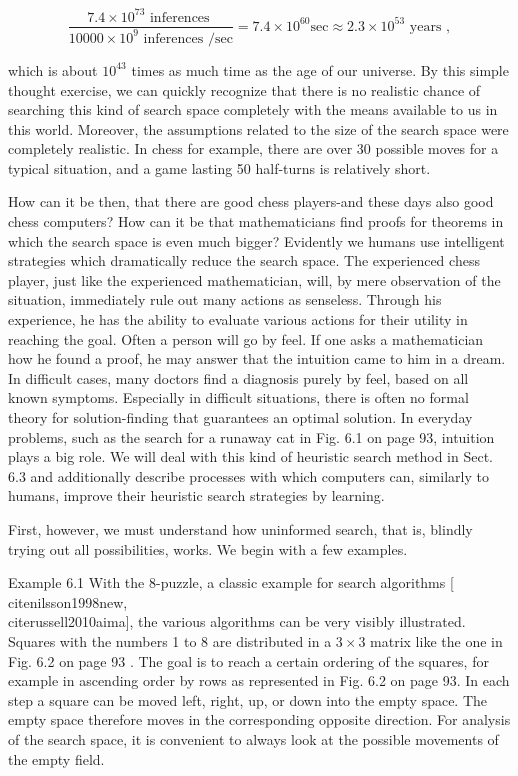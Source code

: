 \documentclass[10pt]{book}
\begin{document}
$$
\frac{7.4 \times 10^{73} \text { inferences }}{10000 \times 10^{9} \text { inferences } / \mathrm{sec}}=7.4 \times 10^{60} \mathrm{sec} \approx 2.3 \times 10^{53} \text { years },
$$

which is about $10^{43}$ times as much time as the age of our universe. By this simple thought exercise, we can quickly recognize that there is no realistic chance of searching this kind of search space completely with the means available to us in this world. Moreover, the assumptions related to the size of the search space were completely realistic. In chess for example, there are over 30 possible moves for a typical situation, and a game lasting 50 half-turns is relatively short.

How can it be then, that there are good chess players-and these days also good chess computers? How can it be that mathematicians find proofs for theorems in which the search space is even much bigger? Evidently we humans use intelligent strategies which dramatically reduce the search space. The experienced chess player, just like the experienced mathematician, will, by mere observation of the situation, immediately rule out many actions as senseless. Through his experience, he has the ability to evaluate various actions for their utility in reaching the goal. Often a person will go by feel. If one asks a mathematician how he found a proof, he may answer that the intuition came to him in a dream. In difficult cases, many doctors find a diagnosis purely by feel, based on all known symptoms. Especially in difficult situations, there is often no formal theory for solution-finding that guarantees an optimal solution. In everyday problems, such as the search for a runaway cat in Fig. 6.1 on page 93, intuition plays a big role. We will deal with this kind of heuristic search method in Sect. 6.3 and additionally describe processes with which computers can, similarly to humans, improve their heuristic search strategies by learning.

First, however, we must understand how uninformed search, that is, blindly trying out all possibilities, works. We begin with a few examples.

Example 6.1 With the 8-puzzle, a classic example for search algorithms [\\cite{nilsson1998new}, \\cite{russell2010aima}], the various algorithms can be very visibly illustrated. Squares with the numbers 1 to 8 are distributed in a $3 \times 3$ matrix like the one in Fig. 6.2 on page 93 . The goal is to reach a certain ordering of the squares, for example in ascending order by rows as represented in Fig. 6.2 on page 93. In each step a square can be moved left, right, up, or down into the empty space. The empty space therefore moves in the corresponding opposite direction. For analysis of the search space, it is convenient to always look at the possible movements of the empty field.
\end{document}
